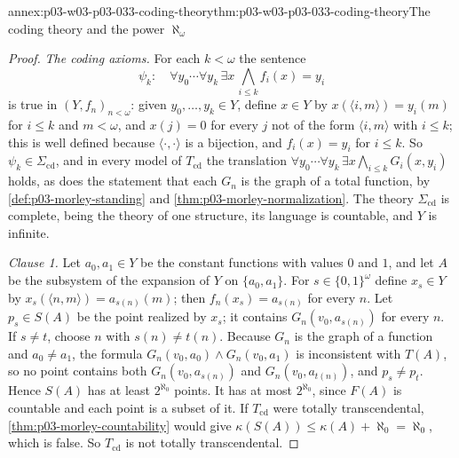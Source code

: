 \begin{annexitem}{annex:p03-w03-p03-033-coding-theory}{thm:p03-w03-p03-033-coding-theory}{The coding theory and the power \(\aleph_\omega\)}
\begin{proof}
\emph{The coding axioms.} For each \(k<\omega\) the sentence
\[
 \psi_k:\quad \forall y_0\cdots\forall y_k\,\exists x\,
 \bigwedge_{i\leq k}f_i(x)=y_i
\]
is true in \((Y,f_n)_{n<\omega}\): given \(y_0,\dots,y_k\in Y\), define
\(x\in Y\) by \(x(\langle i,m\rangle)=y_i(m)\) for \(i\leq k\) and
\(m<\omega\), and \(x(j)=0\) for every \(j\) not of the form
\(\langle i,m\rangle\) with \(i\leq k\); this is well defined because
\(\langle\cdot,\cdot\rangle\) is a bijection, and \(f_i(x)=y_i\) for
\(i\leq k\). So \(\psi_k\in\Sigma_{\mathrm{cd}}\), and in every model of
\(T_{\mathrm{cd}}\) the translation
\(\forall y_0\cdots\forall y_k\,\exists x\bigwedge_{i\leq k}G_i(x,y_i)\)
holds, as does the statement that each \(G_n\) is the graph of a total
function, by \cref{def:p03-morley-standing} and
\cref{thm:p03-morley-normalization}. The theory \(\Sigma_{\mathrm{cd}}\)
is complete, being the theory of one structure, its language is
countable, and \(Y\) is infinite.

\emph{Clause 1.} Let \(a_0,a_1\in Y\) be the constant functions with
values \(0\) and \(1\), and let \(A\) be the subsystem of the expansion of
\(Y\) on \(\{a_0,a_1\}\). For \(s\in\{0,1\}^\omega\) define \(x_s\in Y\)
by \(x_s(\langle n,m\rangle)=a_{s(n)}(m)\); then \(f_n(x_s)=a_{s(n)}\) for
every \(n\). Let \(p_s\in S(A)\) be the point realized by \(x_s\); it
contains \(G_n(v_0,a_{s(n)})\) for every \(n\). If \(s\neq t\), choose
\(n\) with \(s(n)\neq t(n)\). Because \(G_n\) is the graph of a function
and \(a_0\neq a_1\), the formula
\(G_n(v_0,a_0)\wedge G_n(v_0,a_1)\) is inconsistent with \(T(A)\), so no
point contains both \(G_n(v_0,a_{s(n)})\) and \(G_n(v_0,a_{t(n)})\), and
\(p_s\neq p_t\). Hence \(S(A)\) has at least \(2^{\aleph_0}\) points. It
has at most \(2^{\aleph_0}\), since \(F(A)\) is countable and each point is
a subset of it. If \(T_{\mathrm{cd}}\) were totally transcendental,
\cref{thm:p03-morley-countability} would give
\(\kappa(S(A))\leq\kappa(A)+\aleph_0=\aleph_0\), which is false. So
\(T_{\mathrm{cd}}\) is not totally transcendental.


\end{proof}
\end{annexitem}
